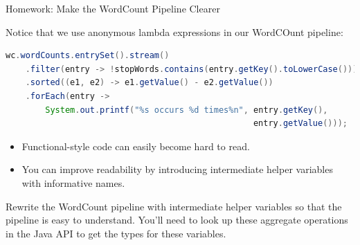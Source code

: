 \documentclass{beamer}
\begin{document}
\begin{frame}[fragile]{Homework: Make the WordCount Pipeline Clearer}

Notice that we use anonymous lambda expressions in our WordCOunt pipeline:
\begin{lstlisting}[language=Java]
wc.wordCounts.entrySet().stream()
    .filter(entry -> !stopWords.contains(entry.getKey().toLowerCase()))
    .sorted((e1, e2) -> e1.getValue() - e2.getValue())
    .forEach(entry ->
        System.out.printf("%s occurs %d times%n", entry.getKey(),
                                                  entry.getValue()));
\end{lstlisting}

\begin{itemize}
\item Functional-style code can easily become hard to read.
\item You can improve readability by introducing intermediate helper variables with informative names.
\end{itemize}
Rewrite the WordCount pipeline with intermediate helper variables so that the pipeline is easy to understand.  You'll need to look up these aggregate operations in the Java API to get the types for these variables.

\end{frame}








\end{document}

